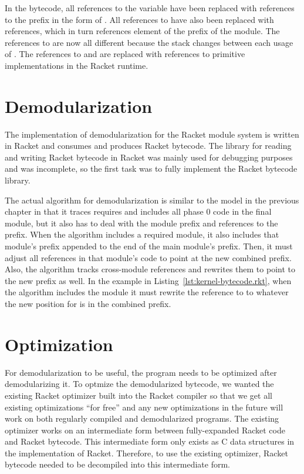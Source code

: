 In the bytecode, all references to the variable  have been replaced with references to the prefix in the form of . 
All references to  have also been replaced with  references, which in turn references element  of the prefix of the  module.
The references to  are now all different because the stack changes between each usage of .
The references to  and \racket{+} are replaced with references to primitive implementations in the Racket runtime. 

\section{Demodularization}

The implementation of demodularization for the Racket module system is written in Racket and consumes and produces Racket bytecode.
The library for reading and writing Racket bytecode in Racket was mainly used for debugging purposes and was incomplete, so the first task was to fully implement the Racket bytecode library.

The actual algorithm for demodularization is similar to the model in the previous chapter in that it traces requires and includes all phase 0 code in the final module, but it also has to deal with the module prefix and references to the prefix.
When the algorithm includes a required module, it also includes that module's prefix appended to the end of the main module's prefix. 
Then, it must adjust all references in that module's code to point at the new combined prefix.
Also, the algorithm tracks cross-module references and rewrites them to point to the new prefix as well.
In the example in Listing~\ref{lst:kernel-bytecode.rkt}, when the algorithm includes the module  it must rewrite the reference to  to whatever the new position for  is in the combined prefix.

\section{Optimization}

For demodularization to be useful, the program needs to be optimized after demodularizing it.
To optmize the demodularized bytecode, we wanted the existing Racket optimizer built into the Racket compiler so that we get all existing optimizations ``for free'' and any new optimizations in the future will work on both regularly compiled and demodularized programs.
The existing optimizer works on an intermediate form between fully-expanded Racket code and Racket bytecode.
This intermediate form only exists as C data structures in the implementation of Racket.
Therefore, to use the existing optimizer, Racket bytecode needed to be decompiled into this intermediate form. 


